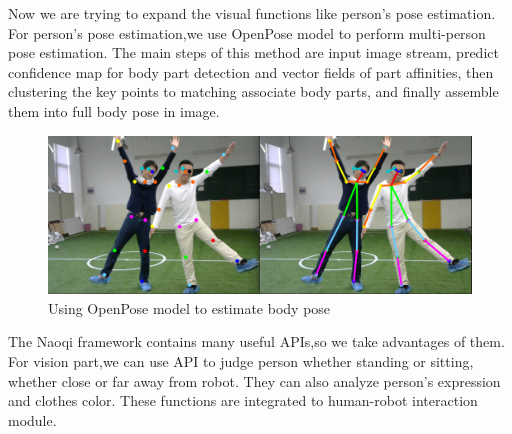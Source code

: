 Now we are trying to expand the visual functions like person's pose estimation. 
For person's pose estimation,we use OpenPose model to perform multi-person pose estimation. 
The main steps of this method are input image stream, predict confidence map for body part detection and vector fields of part affinities, then clustering the key points to matching associate body parts, and finally assemble them into full body pose in image. 
\begin{figure}[h!]
    \centering
    \includegraphics[width=1.\textwidth]{figs/vision2.png}
    \caption{Using OpenPose model to estimate body pose}
    \label{fig:vision2}
    \end{figure}

The Naoqi framework contains many useful APIs,so we take advantages of them. 
For vision part,we can use API to judge person whether standing or sitting, whether close or far away from robot. 
They can also analyze person's expression and clothes color. These functions are integrated to human-robot interaction module.